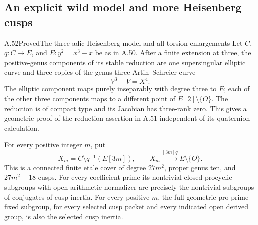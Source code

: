\subsection{An explicit wild model and more Heisenberg cusps}

\begin{statement}{A.52}{Proved}{The three-adic Heisenberg model and all torsion enlargements}
Let \(C\), \(q:C\to E\), and \(E:y^2=x^3-x\) be as in A.50.
After a finite extension at three, the positive-genus components of
its stable reduction are one supersingular elliptic curve and three
copies of the genus-three Artin--Schreier curve
\[
                         V^3-V=X^4.                    \tag{A.52.1}
\]
The elliptic component maps purely inseparably with degree three to
\(E\); each of the other three components maps to a different point
of \(E[2]\setminus\{O\}\). The reduction is of compact type and its
Jacobian has three-rank zero. This gives a geometric proof of the
reduction assertion in A.51 independent of its quaternion calculation.

For every positive integer \(m\), put
\[
 X_m=C\setminus q^{-1}(E[3m]),\qquad
                 X_m\xrightarrow{[3m]q}E\setminus\{O\}.
                                                               \tag{A.52.2}
\]
This is a connected finite etale cover of degree \(27m^2\), proper
genus ten, and \(27m^2-18\) cusps. For every coefficient prime its
nontrivial closed procyclic subgroups with open arithmetic normalizer
are precisely the nontrivial subgroups of conjugates of cusp inertia.
For every positive \(m\), the full geometric pro-prime fixed subgroup,
for every selected cusp packet and every indicated open derived group,
is also the selected cusp inertia.
\end{statement}


